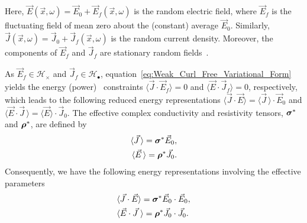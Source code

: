 \documentclass{cmslatex}
\newcommand\bsig{\mbox{\boldmath${\sigma}$}}
\newcommand\brho{\mbox{\boldmath${\rho}$}}
\begin{document}
%
Here, $\vec{E}(\vec{x},\omega)=\vec{E}_0+\vec{E}_f(\vec{x},\omega)$ is the
random electric field, where $\vec{E}_f$ is the fluctuating field of
mean zero about the (constant) average $\vec{E}_0$. Similarly,
$\vec{J}(\vec{x},\omega)=\vec{J}_0+\vec{J}_f(\vec{x},\omega)$ is the random  
current density. Moreover, the components of $\vec{E}_f$ and
$\vec{J}_f$ are stationary random fields~\cite{Golden:CMP-473}. 





As $\vec{E}_f\in\mathscr{H}_\times$ and $\vec{J}_f\in\mathscr{H}_\bullet$,
equation~\eqref{eq:Weak_Curl_Free_Variational_Form} yields the energy
(power)~\cite{Jackson-1999} constraints $\langle\vec{J}\cdot\vec{E}_f\rangle=0$ and
$\langle\vec{E}\cdot\vec{J}_f\rangle=0$, respectively, which leads to the following
reduced energy representations $\langle\vec{J}\cdot\vec{E}\rangle=\langle\vec{J}\,\rangle\cdot\vec{E}_0$
and $\langle\vec{E}\cdot\vec{J}\,\rangle=\langle\vec{E}\rangle\cdot\vec{J}_0$. The effective complex
conductivity and resistivity tensors, $\bsig^*$ and $\brho^*$, are
defined by   
%
\begin{align}\label{eq:eff_eps_def}
    \langle \vec{J} \,\rangle=  \bsig^* \vec{E}_0,
    \\
    \langle \vec{E} \,\rangle=  \brho^*\vec{J}_0.
    \notag
\end{align}
%
Consequently, we have the following energy representations involving
the effective parameters 
%
\begin{align}\label{eq:Energy_Reps}
  &\langle\vec{J}\cdot\vec{E}\rangle=\bsig^*\vec{E}_0\cdot\vec{E}_0,
  \\
  &\langle\vec{E}\cdot\vec{J}\;\rangle=\brho^*\vec{J}_0\cdot\vec{J}_0.
  \notag
\end{align}
%
\end{document}
